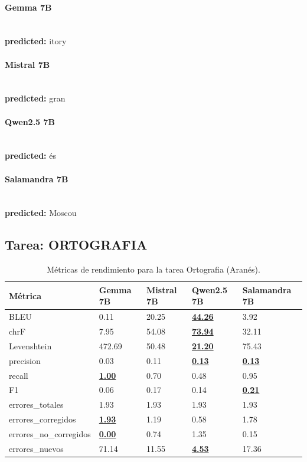 \paragraph{Gemma 7B}~\\
\textbf{predicted:} itory

\paragraph{Mistral 7B}~\\
\textbf{predicted:} gran

\paragraph{Qwen2.5 7B}~\\
\textbf{predicted:} és

\paragraph{Salamandra 7B}~\\
\textbf{predicted:} Moscou

\subsection{Tarea: ORTOGRAFIA}\label{tarea-ortografia}
\begin{longtable}[]{@{}lllll@{}}
\toprule\noalign{}
Métrica & Gemma 7B & Mistral 7B & Qwen2.5 7B & Salamandra 7B \\
\midrule\noalign{}
\endhead
\bottomrule\noalign{}
\caption{Métricas de rendimiento para la tarea Ortografia (Aranés).}
\label{tab:metricas_ortografia_Aranés}
\endlastfoot
BLEU & 0.11 & 20.25 & \textbf{\underline{44.26}} & 3.92 \\
chrF & 7.95 & 54.08 & \textbf{\underline{73.94}} & 32.11 \\
Levenshtein & 472.69 & 50.48 & \textbf{\underline{21.20}} & 75.43 \\
precision & 0.03 & 0.11 & \textbf{\underline{0.13}} & \textbf{\underline{0.13}} \\
recall & \textbf{\underline{1.00}} & 0.70 & 0.48 & 0.95 \\
F1 & 0.06 & 0.17 & 0.14 & \textbf{\underline{0.21}} \\
errores\_totales & 1.93 & 1.93 & 1.93 & 1.93 \\
errores\_corregidos & \textbf{\underline{1.93}} & 1.19 & 0.58 & 1.78 \\
errores\_no\_corregidos & \textbf{\underline{0.00}} & 0.74 & 1.35 & 0.15 \\
errores\_nuevos & 71.14 & 11.55 & \textbf{\underline{4.53}} & 17.36 \\
\end{longtable}

